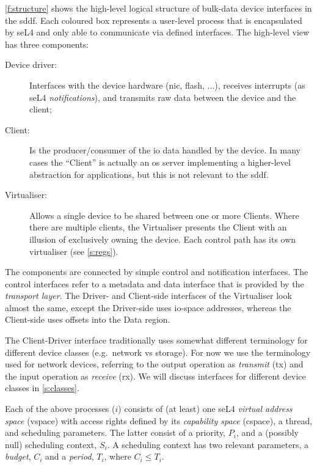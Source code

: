 \documentclass[a4paper,12pt]{report}
\newcommand{\Obj}[1]{\textsl{#1}}
\begin{document}
\autoref{f:structure} shows the high-level logical structure of
bulk-data device
interfaces in the \gls{sddf}. Each coloured box represents a user-level
process that is encapsulated by seL4 and only able to communicate via
defined interfaces. The high-level view has three components:

\begin{description}
\item[Device driver:] Interfaces with the device hardware (\gls{nic},
  flash, ...), receives interrupts (as seL4 \Obj{notifications}), and
  transmits raw data between the device and the client;
\item[Client:] Is the producer/consumer of the \gls{io} data handled by
  the device. In many cases the ``Client'' is actually an \gls{os} server
  implementing a higher-level abstraction for applications, but this
  is not relevant to the \gls{sddf}.
\item[Virtualiser:] Allows a single device to be shared between one or
  more Clients. Where there are multiple clients, the Virtualiser presents the
  Client with an illusion of exclusively owning the device. Each
  control path has its own virtualiser (see \autoref{s:regs}).
\end{description}

The components are connected by simple control and notification
interfaces. The control interfaces refer to a metadata and data interface that is
provided by the \emph{transport layer}. The Driver- and Client-side
interfaces of the Virtualiser look almost the same, except the
Driver-side uses \gls{io}-space addresses, whereas the Client-side uses
offsets into the Data region.

The Client-Driver interface traditionally uses somewhat different
terminology for different device classes (e.g.\ network vs
storage). For now we use the terminology used for network devices,
referring to the output operation as \emph{transmit} (\gls{tx}) and the
input operation as \emph{receive} (\gls{rx}). We will discuss interfaces for
different device classes in \autoref{s:classes}.

Each of the above processes (\(i\)) consists of (at least) one seL4
\emph{virtual address space} (\gls{vspace}) with access
rights defined by its \emph{capability space} (\gls{cspace}), a thread, and scheduling parameters. The
latter consist of a
priority, \(P_i\), and a (possibly null) scheduling context, \(S_i\). A
scheduling context has two relevant parameters, a \emph{budget},
\(C_i\) and a \emph{period}, \(T_i\), where \(C_i \leq T_i\).
\end{document}
